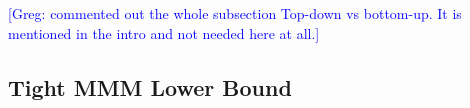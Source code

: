 \documentclass[sigplan,review,anonymous]{acmart}\settopmatter{printfolios=true,printccs=false,printacmref=false}
\newcommand\greg[1]{\textcolor{blue}{[Greg: #1]}}
\newcommand\mac[1]{\textcolor{red}{[Mac: #1]}}
\begin{document}
\greg{commented out the whole subsection Top-down vs bottom-up. It is mentioned 
in the intro and not needed here at all.}

%
%


\subsection{Tight MMM Lower Bound}
\label{sec:seqScheduling}
\end{document}
